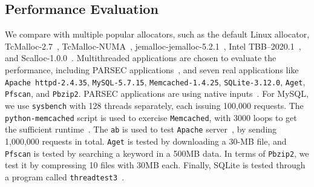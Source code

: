 \subsection{Performance Evaluation}

\label{sec:performance}

 We compare \NM{} with multiple popular allocators, such as the default Linux allocator, TcMalloc-2.7~\cite{tcmalloc},  TcMalloc-NUMA~\cite{tcmallocnew}, jemalloc-jemalloc-5.2.1~\cite{jemalloc}, Intel TBB--2020.1~\cite{tbb}, and Scalloc-1.0.0~\cite{Scalloc}. 
Multithreaded applications are chosen to evaluate the performance, including PARSEC applications~\cite{parsec}, and seven real applications like \texttt{Apache httpd-2.4.35}, \texttt{MySQL-5.7.15}, \texttt{Memcached-1.4.25}, \texttt{SQLite-3.12.0}, \texttt{Aget}, \texttt{Pfscan}, and \texttt{Pbzip2}. 
PARSEC applications are using native inputs~\cite{parsec}. For MySQL, we use \texttt{sysbench} with 128 threads separately, each issuing 100,000 requests. The \texttt{python-memcached} script is used to exercise \texttt{Memcached}, with 3000 loops to get the sufficient runtime~\cite{memcached}. The \texttt{ab} is used to test \texttt{Apache} server~\cite{apachetest}, by sending 1,000,000 requests in total. \texttt{Aget} is tested by downloading a 30-MB file, and \texttt{Pfscan} is tested by searching  a keyword in a 500MB data. In terms of \texttt{Pbzip2}, we test it by compressing 10 files with 30MB each. Finally, SQLite is tested through a program called \texttt{threadtest3}~\cite{sqlitetest}. 

